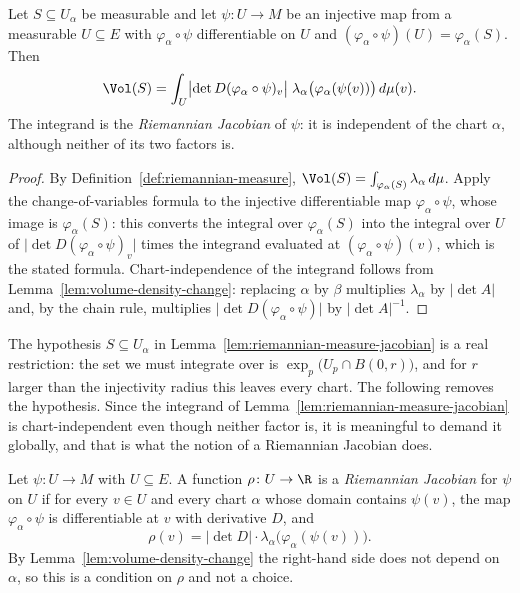 \begin{lemma}
\label{lem:riemannian-measure-jacobian}
\leanok



Let $S\subseteq U_\alpha$ be measurable and let $\psi\colon U\to M$ be an injective map from a
measurable $U\subseteq E$ with $\varphi_\alpha\circ\psi$ differentiable on $U$ and
$(\varphi_\alpha\circ\psi)(U)=\varphi_\alpha(S)$. Then
$$\Vol(S)=\int_U \bigl\lvert\det D(\varphi_\alpha\circ\psi)_v\bigr\rvert\;
\lambda_\alpha\bigl(\varphi_\alpha(\psi(v))\bigr)\,d\mu(v).$$
The integrand is the \emph{Riemannian Jacobian} of $\psi$: it is independent of the chart
$\alpha$, although neither of its two factors is.
\end{lemma}

\begin{proof}
\sketch
{}
\leanok
By Definition~\ref{def:riemannian-measure},
$\Vol(S)=\int_{\varphi_\alpha(S)}\lambda_\alpha\,d\mu$. Apply the change-of-variables formula
to the injective differentiable map $\varphi_\alpha\circ\psi$, whose image is
$\varphi_\alpha(S)$: this converts the integral over $\varphi_\alpha(S)$ into the integral
over $U$ of $\lvert\det D(\varphi_\alpha\circ\psi)_v\rvert$ times the integrand evaluated at
$(\varphi_\alpha\circ\psi)(v)$, which is the stated formula. Chart-independence of the
integrand follows from Lemma~\ref{lem:volume-density-change}: replacing $\alpha$ by $\beta$
multiplies $\lambda_\alpha$ by $\lvert\det A\rvert$ and, by the chain rule, multiplies
$\lvert\det D(\varphi_\alpha\circ\psi)\rvert$ by $\lvert\det A\rvert^{-1}$.
\end{proof}

The hypothesis $S\subseteq U_\alpha$ in
Lemma~\ref{lem:riemannian-measure-jacobian} is a real restriction: the
set we must integrate over is $\exp_p\bigl(U_p\cap B(0,r)\bigr)$, and
for $r$ larger than the injectivity radius this leaves every chart. The
following removes the hypothesis. Since the integrand of
Lemma~\ref{lem:riemannian-measure-jacobian} is chart-independent even
though neither factor is, it is meaningful to demand it globally, and
that is what the notion of a Riemannian Jacobian does.

\begin{definition}
\label{def:riemannian-jacobian}
\leanok



Let $\psi\colon U\to M$ with $U\subseteq E$. A function $\rho\colon
U\to\R$ is a \emph{Riemannian Jacobian} for $\psi$ on $U$ if for every
$v\in U$ and every chart $\alpha$ whose domain contains $\psi(v)$, the
map $\varphi_\alpha\circ\psi$ is differentiable at $v$ with derivative
$D$, and
$$\rho(v)=\lvert\det D\rvert\cdot
\lambda_\alpha\bigl(\varphi_\alpha(\psi(v))\bigr).$$
By Lemma~\ref{lem:volume-density-change} the right-hand side does not
depend on $\alpha$, so this is a condition on $\rho$ and not a choice.
\end{definition}

